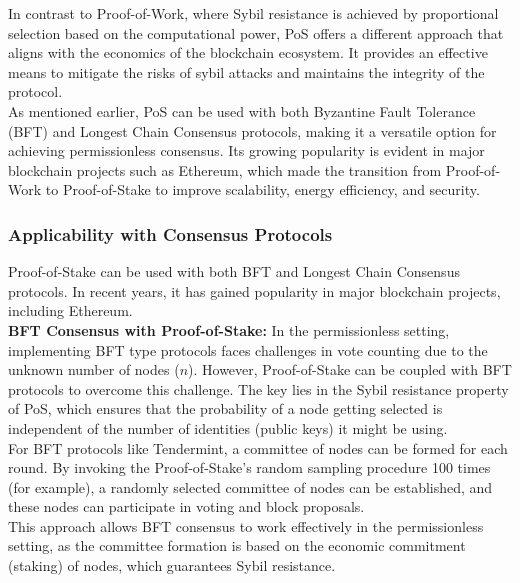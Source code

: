 In contrast to Proof-of-Work, where Sybil resistance is achieved by proportional selection based on the computational power, PoS offers a different approach that aligns with the economics of the blockchain ecosystem. It provides an effective means to mitigate the risks of sybil attacks and maintains the integrity of the protocol.\\
As mentioned earlier, PoS can be used with both Byzantine Fault Tolerance (BFT) and Longest Chain Consensus protocols, making it a versatile option for achieving permissionless consensus. Its growing popularity is evident in major blockchain projects such as Ethereum, which made the transition from Proof-of-Work to Proof-of-Stake to improve scalability, energy efficiency, and security.

\subsubsection{Applicability with Consensus Protocols}
Proof-of-Stake can be used with both BFT and Longest Chain Consensus protocols. In recent years, it has gained popularity in major blockchain projects, including Ethereum.\\

\noindent
\textbf{BFT Consensus with Proof-of-Stake: }
In the permissionless setting, implementing BFT type protocols faces challenges in vote counting due to the unknown number of nodes ($n$). However, Proof-of-Stake can be coupled with BFT protocols to overcome this challenge. The key lies in the Sybil resistance property of PoS, which ensures that the probability of a node getting selected is independent of the number of identities (public keys) it might be using.\\
For BFT protocols like Tendermint, a committee of nodes can be formed for each round. By invoking the Proof-of-Stake's random sampling procedure 100 times (for example), a randomly selected committee of nodes can be established, and these nodes can participate in voting and block proposals.\\
This approach allows BFT consensus to work effectively in the permissionless setting, as the committee formation is based on the economic commitment (staking) of nodes, which guarantees Sybil resistance.\\

